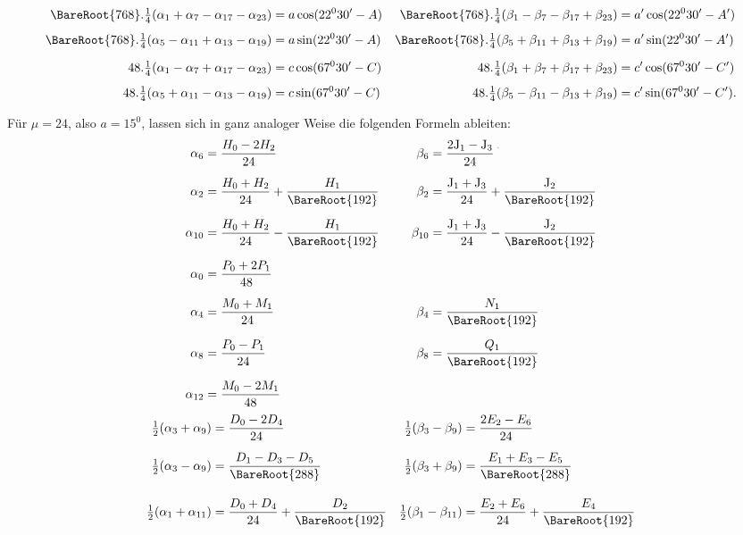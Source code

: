\begin{landscape}
\[\begin{aligned}
\BareRoot{768}\mathord{.}\tfrac14(\alpha_1+\alpha_7-\alpha_{17}-\alpha_{23})&=a\cos(22^0 30'-A)&\BareRoot{768}\mathord{.}\tfrac14(\beta_1-\beta_7-\beta_{17}+\beta_{23})&=a'\cos(22^0 30'-A')\\[4pt]
\BareRoot{768}\mathord{.}\tfrac14(\alpha_5-\alpha_{11}+\alpha_{13}-\alpha_{19})&=a\sin(22^0 30'-A)&\BareRoot{768}\mathord{.}\tfrac14(\beta_5+\beta_{11}+\beta_{13}+\beta_{19})&=a'\sin(22^0 30'-A')\\[6pt]
48\mathord{.}\tfrac14(\alpha_1-\alpha_7+\alpha_{17}-\alpha_{23})&=c\cos(67^0 30'-C)&48\mathord{.}\tfrac14(\beta_1+\beta_7+\beta_{17}+\beta_{23})&=c'\cos(67^0 30'-C')\\[4pt]
48\mathord{.}\tfrac14(\alpha_5+\alpha_{11}-\alpha_{13}-\alpha_{19})&=c\sin(67^0 30'-C)&48\mathord{.}\tfrac14(\beta_5-\beta_{11}-\beta_{13}+\beta_{19})&=c'\sin(67^0 30'-C').
\end{aligned}
\]
\par\noindent\hspace*{\parindent}Für \(\mu=24\), also \(a=15^0\), lassen sich in ganz analoger Weise die folgenden Formeln ableiten:
\[
\begin{aligned}
\alpha_6&=\frac{H_0-2H_2}{24}&\qquad\beta_6&=\frac{2\mathrm{J}_1-\mathrm{J}_3}{24}\VthreeUpperMark\\[6pt]
\alpha_2&=\frac{H_0+H_2}{24}+\frac{H_1}{\BareRoot{192}}&\beta_2&=\frac{\mathrm{J}_1+\mathrm{J}_3}{24}+\frac{\mathrm{J}_2}{\BareRoot{192}}\\[6pt]
\alpha_{10}&=\frac{H_0+H_2}{24}-\frac{H_1}{\BareRoot{192}}&\beta_{10}&=\frac{\mathrm{J}_1+\mathrm{J}_3}{24}-\frac{\mathrm{J}_2}{\BareRoot{192}}\\[6pt]
\alpha_0&=\frac{P_0+2P_1}{48}&&\\[6pt]
\alpha_4&=\frac{M_0+M_1}{24}&\beta_4&=\frac{N_1}{\BareRoot{192}}\\[6pt]
\alpha_8&=\frac{P_0-P_1}{24}&\beta_8&=\frac{Q_1}{\BareRoot{192}}\\[6pt]
\alpha_{12}&=\frac{M_0-2M_1}{48}&&
\end{aligned}
\]
\clearpage
\[
\begin{aligned}
\tfrac12(\alpha_3+\alpha_9)&=\frac{D_0-2D_4}{24}&\tfrac12(\beta_3-\beta_9)&=\frac{2E_2-E_6}{24}\\[6pt]
\tfrac12(\alpha_3-\alpha_9)&=\frac{D_1-D_3-D_5}{\BareRoot{288}}&\tfrac12(\beta_3+\beta_9)&=\frac{E_1+E_3-E_5}{\BareRoot{288}}\\[10pt]
\tfrac12(\alpha_1+\alpha_{11})&=\frac{D_0+D_4}{24}+\frac{D_2}{\BareRoot{192}}&\tfrac12(\beta_1-\beta_{11})&=\frac{E_2+E_6}{24}+\frac{E_4}{\BareRoot{192}}\\[6pt]

\end{aligned}\]
\end{landscape}
